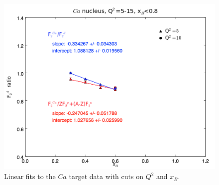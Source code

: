 \documentclass[oneside]{article}
\begin{document}
\begin{figure}[H]
\begin{minipage}{0.5\textwidth}
\includegraphics[width=\textwidth]{plots/q2_all_x_all/all_Ca.png}
\end{minipage}
  \caption[]{Linear fits to the $Ca$ target data with cuts on $Q^2$ and $x_B$.}
  \label{fig:fits_Ca}
\end{figure}   
\end{document}
